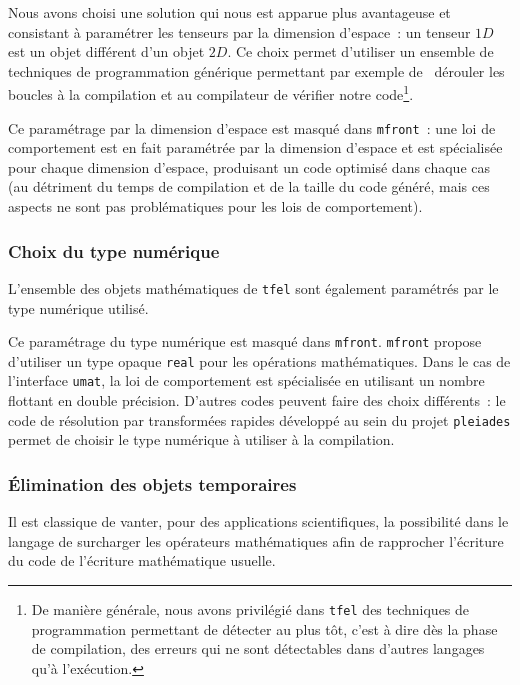 \documentclass[rectoverso,pleiades,pstricks,leqno,anti]{texmf/note_technique_2010}
\newcommand{\pleiades}{\texttt{pleiades}}
\newcommand{\tfel}{\texttt{tfel}}
\newcommand{\mfront}{\texttt{mfront}}
\def\ifmonospace{\ifdim\fontdimen3\font=0pt }
\def\cpp{%
\ifmonospace%
    C++%
\else%
    C\kern-.1667em\raise.30ex\hbox{\smaller{++}}%
\fi%
\spacefactor1000 }
\begin{document}
Nous avons choisi une solution qui nous est apparue plus avantageuse et
consistant à paramétrer les tenseurs par la dimension d'espace~: un
tenseur \(1D\) est un objet différent d'un objet \(2D\). Ce choix permet
d'utiliser un ensemble de techniques de programmation générique
permettant par exemple de \og~dérouler les boucles\fg{} à la compilation
et au compilateur de vérifier notre code\footnote{De manière générale,
  nous avons privilégié dans \tfel{} des techniques de programmation
  permettant de détecter au plus tôt, c'est à dire dès la phase de
  compilation, des erreurs qui ne sont détectables dans d'autres
  langages qu'à l'exécution.}.

Ce paramétrage par la dimension d'espace est masqué dans \mfront{}~:
une loi de comportement est en fait paramétrée par la dimension
d'espace et est spécialisée pour chaque dimension d'espace, produisant
un code optimisé dans chaque cas (au détriment du temps de compilation
et de la taille du code généré, mais ces aspects ne sont pas
problématiques pour les lois de comportement).

\subsubsection{Choix du type numérique}

L'ensemble des objets mathématiques de \tfel{} sont également
paramétrés par le type numérique utilisé. 

Ce paramétrage du type numérique est masqué dans \mfront{}. \mfront{}
propose d'utiliser un type opaque \texttt{real} pour les opérations
mathématiques. Dans le cas de l'interface \texttt{umat}, la loi de
comportement est spécialisée en utilisant un nombre flottant en double
précision. D'autres codes peuvent faire des choix différents~: le code
de résolution par transformées rapides développé au sein du projet
\pleiades{} permet de choisir le type numérique à utiliser à la
compilation.

\subsubsection{Élimination des objets temporaires}

Il est classique de vanter, pour des applications scientifiques, la
possibilité dans le langage \cpp{} de surcharger les opérateurs
mathématiques afin de rapprocher l'écriture du code de l'écriture
mathématique usuelle.
\end{document}
